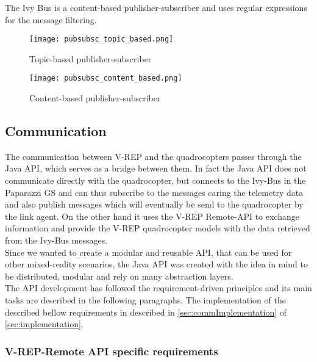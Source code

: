     The Ivy Bus is a content-based publisher-subscriber and uses regular expressions for the message filtering.
    
    \begin{figure}[!tbp]
      \centering
      \begin{minipage}[b]{0.4\textwidth}
        \texttt{[image: pubsubsc\_topic\_based.png]}
        \caption{Topic-based publisher-subscriber \label{fig:pubsubsc_content_based}}
      \end{minipage}
      \hfill
      \begin{minipage}[b]{0.4\textwidth}
        \texttt{[image: pubsubsc\_content\_based.png]}
        \caption{Content-based publisher-subscriber \label{fig:pubsubsc_topic_based}}
      \end{minipage}
    \end{figure}
    
    \subsection{Communication}
    \label{sec:communication}
    
    The communication between V-REP and the quadrocopters passes through the Java API, which serves as a bridge between them. In fact the Java API does not communicate directly with the quadrocopter, but connects to the Ivy-Bus in the Paparazzi GS and can thus subscribe to the messages caring the telemetry data and also publish messages which will eventually be send to the quadrocopter by the link agent. On the other hand it uses the V-REP Remote-API to exchange information and provide the V-REP quadrocopter models with the data retrieved from the Ivy-Bus messages.\\ 
    Since we wanted to create a modular and reusable API, that can be used for other mixed-reality scenarios, the Java API was created with the idea in mind to be distributed, modular and rely on many abstraction layers.\\ 
    The API development has followed the requirement-driven principles and its main tasks are described in the following paragraphs. The implementation of the described bellow requirements in described in \ref{sec:commImplementation} of \ref{sec:implementation}.
    
    \subsubsection{V-REP-Remote API specific requirements}
    \label{sec:requirementsVREP}
    
